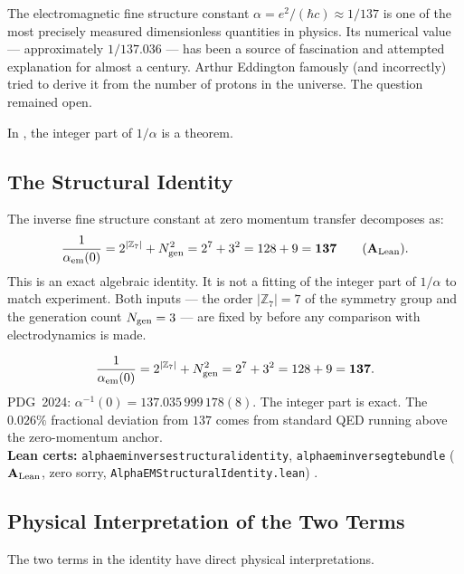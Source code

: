 \documentclass[11pt,openany]{book}
\theoremstyle{remark}
\newcommand{\GTE}{\text{GTE}}
\newcommand{\ZS}{\mathbb{Z}_7}
\newcommand{\lean}[1]{%
  \penalty-100
  \begingroup\def\_{\textunderscore\allowbreak}\texttt{#1}\endgroup}
\newcommand{\Ngen}{N_{\rm gen}}
\newcommand{\CatAL}{\ensuremath{\textbf{A}_{\rm Lean}}}
\begin{document}
The electromagnetic fine structure constant $\alpha = e^2/(\hbar c) \approx 1/137$ is one
of the most precisely measured dimensionless quantities in physics.  Its numerical value
--- approximately $1/137.036$ --- has been a source of fascination and attempted
explanation for almost a century.  Arthur Eddington famously (and incorrectly) tried to
derive it from the number of protons in the universe.  The question remained open.

In \GTE{}, the integer part of $1/\alpha$ is a theorem.

\subsection*{The Structural Identity}

The inverse fine structure constant at zero momentum transfer decomposes as:
\begin{equation}
  \frac{1}{\alpha_{\rm em}(0)} = 2^{|\ZS|} + \Ngen^2
  = 2^7 + 3^2 = 128 + 9 = \mathbf{137}
  \qquad (\CatAL).
  \label{eq:alpha_identity}
\end{equation}
This is an exact algebraic identity.  It is not a fitting of the integer part of
$1/\alpha$ to match experiment.  Both inputs --- the order $|\ZS| = 7$ of the
symmetry group and the generation count $\Ngen = 3$ --- are fixed by \GTE{} before
any comparison with electrodynamics is made.

\begin{tcolorbox}[colback=orange!5,colframe=orange!60,title={Result: Fine Structure Constant (\CatAL)}]
\[
  \frac{1}{\alpha_{\rm em}(0)} = 2^{|\ZS|} + \Ngen^2 = 2^7 + 3^2
  = 128 + 9 = \mathbf{137}.
\]
PDG~2024: $\alpha^{-1}(0) = 137.035\,999\,178(8)$.  The integer part is exact.
The $0.026\%$ fractional deviation from $137$ comes from standard QED running above
the zero-momentum anchor.\\[4pt]
\textbf{Lean certs:} \lean{alpha\_em\_inverse\_structural\_identity}, \lean{alpha\_em\_inverse\_gte\_bundle} (\CatAL, zero sorry, \texttt{AlphaEMStructuralIdentity.lean})
\cite{SpivackGTEUnification}.
\end{tcolorbox}

\subsection*{Physical Interpretation of the Two Terms}

The two terms in the identity have direct physical interpretations.
\end{document}
